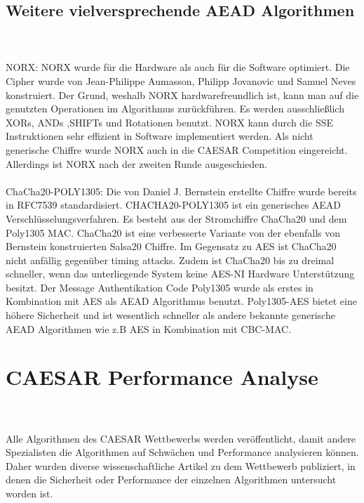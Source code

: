 \subsection{Weitere vielversprechende AEAD Algorithmen}\\
\\
NORX:
NORX wurde für die Hardware als auch für die Software optimiert. Die Cipher wurde von Jean-Philippe Aumasson, Philipp Jovanovic und Samuel Neves konstruiert. Der Grund, weshalb NORX hardwarefreundlich ist, kann man auf die genutzten Operationen im Algorithmus zurückführen. Es werden  ausschließlich XORs, ANDs ,SHIFTs und Rotationen benutzt. NORX kann durch die \gls{SSE} Instruktionen sehr effizient in Software implementiert werden. Als nicht generische Chiffre wurde NORX auch in die \gls{CAESAR} Competition eingereicht. Allerdings ist NORX nach der zweiten Runde ausgeschieden\cite{aumasson2015norx}.\\
\\
ChaCha20-POLY1305:
Die von Daniel J. Bernstein erstellte Chiffre wurde bereits in RFC7539 standardisiert.
CHACHA20-POLY1305 ist ein generisches \gls{AEAD} Verschlüsselungsverfahren. Es besteht aus der Stromchiffre ChaCha20 und dem Poly1305 MAC. ChaCha20 ist eine verbesserte Variante von der ebenfalls von Bernstein konstruierten Salsa20 Chiffre. Im Gegensatz zu \gls{AES} ist ChaCha20 nicht anfällig gegenüber timing attacks. Zudem ist ChaCha20 bis zu dreimal schneller, wenn das unterliegende System keine \gls{AES-NI} Hardware Unterstützung besitzt\cite{bernstein2008chacha}.
Der Message Authentikation Code Poly1305 wurde als erstes in Kombination mit AES als AEAD Algorithmus benutzt. Poly1305-AES bietet eine höhere Sicherheit und ist wesentlich schneller als andere bekannte generische AEAD Algorithmen wie z.B AES in Kombination mit CBC-MAC\cite{10.1007/11502760_3}.
\section{CAESAR Performance Analyse}
\\
\\
Alle Algorithmen des \gls{CAESAR} Wettbewerbs werden veröffentlicht, damit andere Spezialisten die Algorithmen auf Schwächen und Performance analysieren können. Daher wurden diverse wissenschaftliche Artikel zu dem Wettbewerb publiziert, in denen die Sicherheit oder Performance der einzelnen Algorithmen untersucht worden ist.
